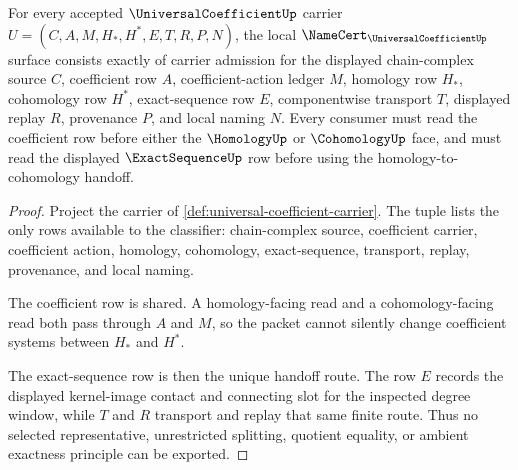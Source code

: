 \begin{theorem}
\label{thm:universal-coefficient-namecert-obligations}
For every accepted $\UniversalCoefficientUp$ carrier $U=(C,A,M,H_*,H^*,E,T,R,P,N)$, the local $\NameCert_{\UniversalCoefficientUp}$ surface consists exactly of carrier admission for the displayed chain-complex source $C$, coefficient row $A$, coefficient-action ledger $M$, homology row $H_*$, cohomology row $H^*$, exact-sequence row $E$, componentwise transport $T$, displayed replay $R$, provenance $P$, and local naming $N$. Every consumer must read the coefficient row before either the $\HomologyUp$ or $\CohomologyUp$ face, and must read the displayed $\ExactSequenceUp$ row before using the homology-to-cohomology handoff.
\end{theorem}
\begin{proof}
Project the carrier of \autoref{def:universal-coefficient-carrier}. The tuple lists the only rows available to the classifier: chain-complex source, coefficient carrier, coefficient action, homology, cohomology, exact-sequence, transport, replay, provenance, and local naming.

The coefficient row is shared. A homology-facing read and a cohomology-facing read both pass through $A$ and $M$, so the packet cannot silently change coefficient systems between $H_*$ and $H^*$.

The exact-sequence row is then the unique handoff route. The row $E$ records the displayed kernel-image contact and connecting slot for the inspected degree window, while $T$ and $R$ transport and replay that same finite route. Thus no selected representative, unrestricted splitting, quotient equality, or ambient exactness principle can be exported.
\end{proof}

